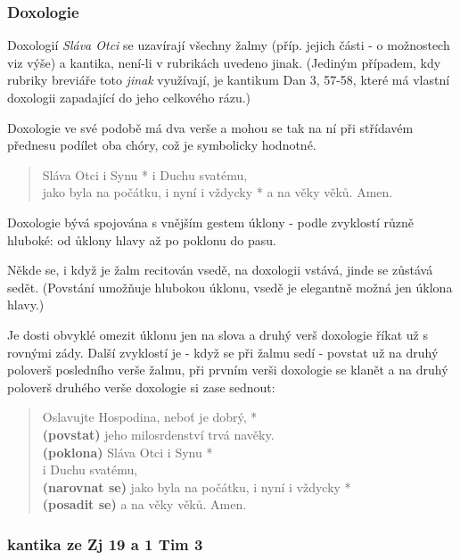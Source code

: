 \subsubsection{Doxologie}
\label{sec:doxologie}

Doxologií \emph{Sláva Otci} se uzavírají všechny žalmy (příp. jejich části -
o možnostech viz výše) a kantika, není-li v rubrikách uvedeno jinak. 
(Jediným případem, kdy rubriky breviáře toto \emph{jinak} využívají,
je kantikum Dan 3, 57-58, které má vlastní doxologii
zapadající do jeho celkového rázu.)

Doxologie ve své  podobě má dva verše a mohou se tak na ní
při střídavém přednesu podílet oba chóry, což je symbolicky hodnotné.

\begin{quote}
Sláva Otci i Synu * i Duchu svatému,\\
jako byla na počátku, i nyní i vždycky * a na věky věků. Amen.
\end{quote}

Doxologie bývá spojována s vnějším gestem úklony - podle zvyklostí různě 
hluboké: od ůklony hlavy až po poklonu do pasu.

Někde se, i když je žalm recitován vsedě, na doxologii vstává,
jinde se zůstává sedět. (Povstání umožňuje hlubokou úklonu, vsedě je
elegantně možná jen úklona hlavy.)

Je dosti obvyklé omezit úklonu jen na slova 
 a druhý verš doxologie říkat už
s rovnými zády.
Další zvyklostí je - když se při žalmu sedí - povstat už na druhý poloverš 
posledního verše žalmu, při prvním verši doxologie se klanět
a na druhý poloverš druhého verše doxologie si zase sednout:

\begin{quote}
Oslavujte Hospodina, neboť je dobrý, *\\
\textbf{(povstat)} jeho milosrdenství trvá navěky.\\

\textbf{(poklona)} Sláva Otci i Synu *\\
i Duchu svatému,\\

\textbf{(narovnat se)} jako byla na počátku, i nyní i vždycky *\\
\textbf{(posadit se)} a na věky věků. Amen.
\end{quote}


\subsubsection{ kantika ze Zj 19 a 1 Tim 3}

